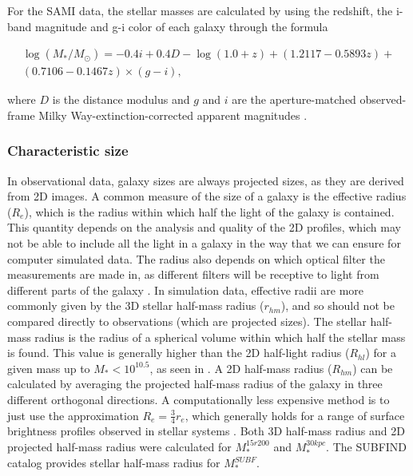 For the SAMI data, the stellar masses are calculated by using the redshift, the i-band magnitude and g-i color of each galaxy through the formula 

\begin{equation}
	\begin{split}
		\log(M_*/M_\odot) = -0.4i + 0.4D - \log(1.0+z) + (1.2117 - 0.5893z) + \\
		 (0.7106 - 0.1467z) \times (g-i), 
	\end{split}
\end{equation}

where $D$ is the distance modulus and $g$ and $i$ are the aperture-matched observed-frame Milky Way-extinction-corrected apparent magnitudes \parencite{Bryant2015}.

\subsubsection{Characteristic size}\label{charsize}

In observational data, galaxy sizes are always projected sizes, as they are derived from 2D images. A common measure of the size of a galaxy is the effective radius ($R_e$), which is the radius within which half the light of the galaxy is contained. This quantity depends on the analysis and quality of the 2D profiles, which may not be able to include all the light in a galaxy in the way that we can ensure for computer simulated data. The radius also depends on which optical filter the measurements are made in, as different filters will be receptive to light from different parts of the galaxy \parencite{Sande2018}. In simulation data, effective radii are more commonly given by the 3D stellar half-mass radius ($r_{hm}$), and so should not be compared directly to observations (which are projected sizes). The stellar half-mass radius is the radius of a spherical volume within which half the stellar mass is found. This value is generally higher than the 2D half-light radius ($R_{hl}$) for a given mass up to $M_{*} < 10^{10.5}$, as seen in \textcite{Genel2017}. A 2D half-mass radius ($R_{hm}$) can be calculated by averaging the projected half-mass radius of the galaxy in three different orthogonal directions. A computationally less expensive method is to just use the approximation $R_{e} = \frac{3}{4} r_{e}$, which generally holds for a range of surface brightness profiles observed in stellar systems \parencite{Wolf2010}. Both 3D half-mass radius and 2D projected half-mass radius were calculated for $M_\ast^{15r200}$ and $M_\ast^{30kpc}$. The SUBFIND catalog provides stellar half-mass radius for $M^{SUBF}_*$.


